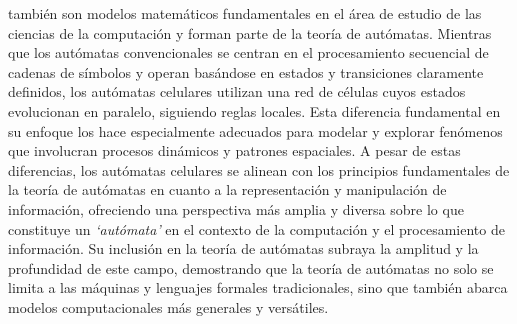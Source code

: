         tambi\'en son modelos matem\'aticos fundamentales en el \'area de estudio de las ciencias de la computaci\'on
        y forman parte de la teor\'ia de aut\'omatas. Mientras que los aut\'omatas convencionales se centran en el procesamiento 
        secuencial de cadenas de s\'imbolos y operan bas\'andose en estados y transiciones claramente definidos, los aut\'omatas 
        celulares utilizan una red de c\'elulas cuyos estados evolucionan en paralelo, siguiendo reglas locales. Esta diferencia 
        fundamental en su enfoque los hace especialmente adecuados para modelar y explorar fen\'omenos que involucran procesos din\'amicos 
        y patrones espaciales. A pesar de estas diferencias, los aut\'omatas celulares se alinean con los principios fundamentales de la 
        teor\'ia de aut\'omatas en cuanto a la representaci\'on y manipulaci\'on de informaci\'on, ofreciendo una perspectiva m\'as amplia y diversa 
        sobre lo que constituye un \textit{`aut\'omata'} en el contexto de la computaci\'on y el procesamiento de informaci\'on. Su inclusi\'on en la teor\'ia 
        de aut\'omatas subraya la amplitud y la profundidad de este campo, demostrando que la teor\'ia de aut\'omatas no solo se limita a las m\'aquinas 
        y lenguajes formales tradicionales, sino que tambi\'en abarca modelos computacionales m\'as generales y vers\'atiles.